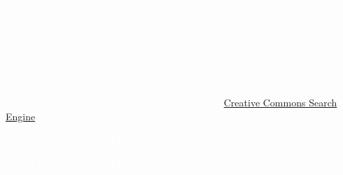 \documentclass[t]{beamer}
\begin{document}
{
\begin{frame}[b]
\tiny\textcolor{white}{NOAA Ocean Explorer, Flickr Creative Commons.}
\end{frame}
}

{
\begin{frame}[b]
\tiny\hfill\textcolor{white}{Ken Sulak, NOAA Photo Library.}
\end{frame}
}

{
\begin{frame}[b]
\end{frame}
}

{
\begin{frame}[b]
\tiny\textcolor{white}{NOAA Ocean Explorer, Flickr Creative Commons.}
\end{frame}
}

{
\begin{frame}[b]
\tiny\hfill\textcolor{white}{Preview photo \textcopyright Shutterstock. All rights reserved.}
\end{frame}
}


{
\begin{frame}[b]
\tiny\textcolor{white}{NOAA Ocean Explorer, Flickr Creative Commons.\hfill\href{http://search.creativecommons.org}{Creative Commons Search Engine}}
\end{frame}
}

{
\begin{frame}[b]
\tiny\hfill\textcolor{white}{NOAA Ocean Explorer, Flickr Creative Commons.}
\end{frame}
}

{
\begin{frame}[b]
\tiny\textcolor{white}{NOAA Ocean Explorer, Flickr Creative Commons.}
\end{frame}
}
\end{document}
